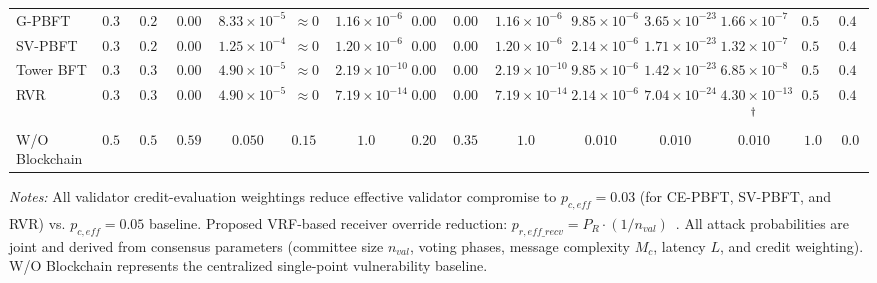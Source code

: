 \documentclass[10pt,twocolumn,journal]{IEEEtran}
\begin{document}
\begin{table}[t]
\begin{tabular}{@{}l|cccccccccccc|cc@{}}
G-PBFT & $0.327$ & $0.251$ & $0.0012$ & $8.33{\times}10^{-5}$ & $\approx 0$ & $1.16{\times}10^{-6}$ & $0.0040$ & $0.0070$ & $1.16{\times}10^{-6}$ & $9.85{\times}10^{-6}$ & $3.65{\times}10^{-23}$ & $1.66{\times}10^{-7}$ & \textbf{$0.502$} & \textbf{$0.498$} \\
SV-PBFT & $0.337$ & $0.251$ & $0.0011$ & $1.25{\times}10^{-4}$ & $\approx 0$ & $1.20{\times}10^{-6}$ & $0.0031$ & $0.0054$ & $1.20{\times}10^{-6}$ & $2.14{\times}10^{-6}$ & $1.71{\times}10^{-23}$ & $1.32{\times}10^{-7}$ & \textbf{$0.509$} & \textbf{$0.491$} \\
Tower BFT & $0.305$ & $0.323$ & $0.0011$ & $4.90{\times}10^{-5}$ & $\approx 0$ & $2.19{\times}10^{-10}$ & $0.0016$ & $0.0029$ & $2.19{\times}10^{-10}$ & $9.85{\times}10^{-6}$ & $1.42{\times}10^{-23}$ & $6.85{\times}10^{-8}$ & \textbf{$0.532$} & \textbf{$0.468$} \\
RVR & $0.305$ & $0.323$ & $0.0011$ & $4.90{\times}10^{-5}$ & $\approx 0$ & $7.19{\times}10^{-14}$ & $0.0013$ & $0.0023$ & $7.19{\times}10^{-14}$ & $2.14{\times}10^{-6}$ & $7.04{\times}10^{-24}$ & $4.30{\times}10^{-13}$$\textsuperscript{\textdagger}$ & \textbf{$0.531$} & \textbf{$0.469$} \\
\midrule
W/O Blockchain & $0.599$ & $0.599$ & $0.599$ & $0.050$ & $0.150$ & $1.0$ & $0.200$ & $0.350$ & $1.0$ & $0.010$ & $0.010$ & $0.010$ & \textbf{$1.0$} & \textbf{$0.0$} \\
\bottomrule
\end{tabular}
\vspace{2pt}
\par\noindent\scriptsize\textit{Notes:} All validator credit-evaluation weightings reduce effective validator compromise to $p_{c,eff} = 0.03$ (for CE-PBFT, SV-PBFT, and RVR) vs. $p_{c,eff} = 0.05$ baseline. \textsuperscript{\textdagger}Proposed VRF-based receiver override reduction: $p_{r,eff\_recv} = P_R \cdot (1/n_{val})$~\cite{wang2025}. All attack probabilities are joint and derived from consensus parameters (committee size $n_{val}$, voting phases, message complexity $M_c$, latency $L$, and credit weighting). W/O Blockchain represents the centralized single-point vulnerability baseline.
\end{table}
\end{document}
